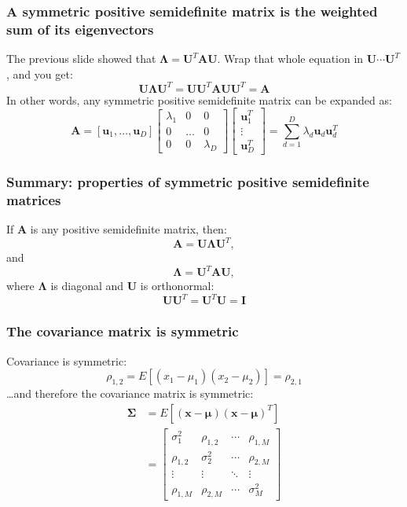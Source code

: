 \documentclass{beamer}
\begin{document}
\begin{frame}
  \frametitle{A symmetric positive semidefinite matrix is the weighted sum of its eigenvectors}

  The previous slide showed that
  $\bm{\Lambda}=\mathbf{U}^T\mathbf{A}\mathbf{U}$.  Wrap that
  whole equation in $\mathbf{U}\cdots\mathbf{U}^T$, and you get:
  \[
  \mathbf{U}\bm{\Lambda}\mathbf{U}^T=
  \mathbf{U}\mathbf{U}^T\bm{A}\mathbf{U}\mathbf{U}^T =\mathbf{A}
  \]
  In other words, any symmetric positive semidefinite matrix can be
  expanded as:
  \[
  \mathbf{A}=
  \left[\mathbf{u}_1,\ldots,\mathbf{u}_{D}\right]
  \left[\begin{array}{ccc}\lambda_1&0&0\\0&\ldots&0\\0&0&\lambda_{D}\end{array}\right]  
  \left[\begin{array}{c}\mathbf{u}_1^T\\\vdots\\\mathbf{u}_{D}^T\end{array}\right]=
  \sum_{d=1}^{D}\lambda_d \mathbf{u}_d\mathbf{u}_d^T
  \]
\end{frame}

\begin{frame}
  \frametitle{Summary: properties of symmetric positive semidefinite
    matrices}

  If $\mathbf{A}$ is any positive semidefinite matrix, then:
  \[
  \mathbf{A}=\mathbf{U}\bm{\Lambda} \mathbf{U}^T,
  \]
  and
  \[
  \bm{\Lambda} = \mathbf{U}^T\mathbf{A}\mathbf{U},
  \]
  where $\bm{\Lambda}$ is diagonal and $\mathbf{U}$ is orthonormal:
  \[
  \mathbf{U}\mathbf{U}^T=\mathbf{U}^T\mathbf{U}=\mathbf{I}
  \]
\end{frame}

\begin{frame}
  \frametitle{The covariance matrix is symmetric}

  Covariance is symmetric:
  \begin{displaymath}
    \rho_{1,2}=E\left[(x_1-\mu_1)(x_2-\mu_2)\right]=\rho_{2,1}
  \end{displaymath}
  \ldots and therefore the covariance matrix is symmetric:
  \begin{align*}
    \bm{\Sigma}&=E\left[(\mathbf{x}-\bm{\mu})(\mathbf{x}-\bm{\mu})^T\right]\\
    &=
    \left[\begin{array}{cccc}
        \sigma_1^2&\rho_{1,2}&\cdots&\rho_{1,M}\\
        \rho_{1,2}&\sigma_2^2&\cdots&\rho_{2,M}\\
        \vdots&\vdots&\ddots&\vdots\\
        \rho_{1,M}&\rho_{2,M}&\cdots&\sigma_M^2
      \end{array}\right]
  \end{align*}
\end{frame}
\end{document}

